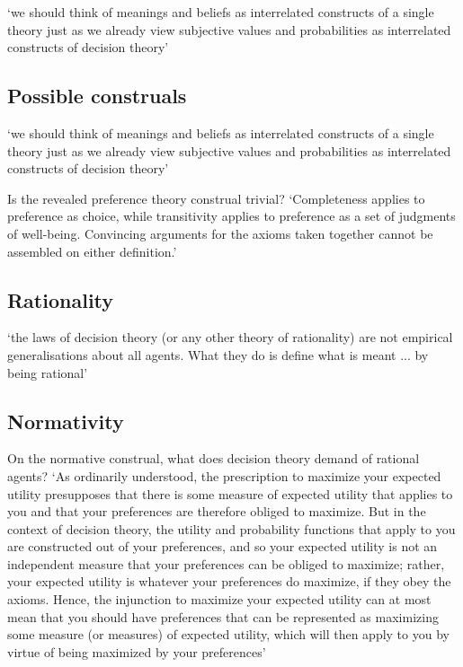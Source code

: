 \documentclass[12pt]{extarticle}
\begin{document}
\begin{multicols*}{3}
‘we should think of meanings and beliefs as interrelated constructs of a single theory just 
as we already view subjective values and probabilities as interrelated constructs of decision theory’
\citep[p.~146]{Davidson:1974gh}


\subsection{Possible construals}
‘we should think of meanings and beliefs as interrelated constructs of a single theory just 
as we already view subjective values and probabilities as interrelated constructs of decision theory’
\citep[p.~146]{Davidson:1974gh}

Is the revealed preference theory construal trivial?
‘Completeness applies to preference as choice, while transitivity applies to preference 
as a set of judgments of well-being. Convincing arguments for the axioms taken together 
cannot be assembled on either definition.’
\citep[p.~374]{mandler:2001_difficult}

\subsection{Rationality}
‘the laws of decision theory (or any other theory of rationality) are not empirical generalisations 
about all agents. What they do is define what is meant ... by being rational’
\citep[p.~43]{Davidson:1987wc}

\subsection{Normativity}
On the normative construal, what does decision theory demand of rational agents?
‘As ordinarily understood, the prescription to maximize your expected utility
presupposes that there is some measure of expected utility that applies to you
and that your preferences are therefore obliged to maximize.
But in the context
of decision  theory, the utility and probability functions that apply to you are constructed
out of your preferences, and so your expected utility is not an independent
measure that your preferences can be obliged to maximize;
rather, your
expected utility is whatever your preferences do maximize, if they obey the
axioms.
Hence, the injunction to maximize your expected utility can at most
mean that you should have preferences that can be represented as maximizing
some measure (or measures) of expected utility, which will then apply to you by
virtue of being maximized by your preferences’
\citep[p.~149]{Velleman:2000fq}
 

\end{multicols*}
\end{document}
